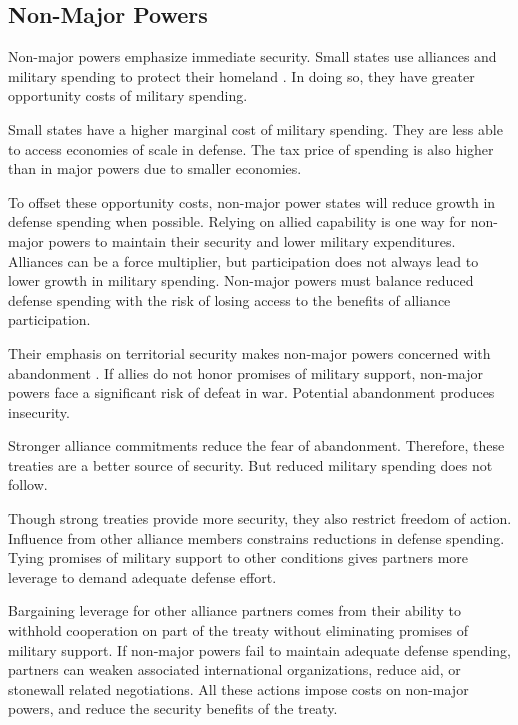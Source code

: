\documentclass[12pt]{article}
\begin{document}
\subsection{Non-Major Powers} 


Non-major powers emphasize immediate security.
Small states use alliances and military spending to protect their homeland \citep{Morrow1991}.  
In doing so, they have greater opportunity costs of military spending. 


Small states have a higher marginal cost of military spending. 
They are less able to access economies of scale in defense. 
The tax price of spending is also higher than in major powers due to smaller economies.  


To offset these opportunity costs, non-major power states will reduce growth in defense spending when possible.
Relying on allied capability is one way for non-major powers to maintain their security and lower military expenditures.  
Alliances can be a force multiplier, but participation does not always lead to lower growth in military spending. 
Non-major powers must balance reduced defense spending with the risk of losing access to the benefits of alliance participation. 


Their emphasis on territorial security makes non-major powers concerned with abandonment \citep{Snyder1997}. 
If allies do not honor promises of military support, non-major powers face a significant risk of defeat in war. 
Potential abandonment produces insecurity. 


Stronger alliance commitments reduce the fear of abandonment. 
Therefore, these treaties are a better source of security. 
But reduced military spending does not follow. 


Though strong treaties provide more security, they also restrict freedom of action. 
Influence from other alliance members constrains reductions in defense spending.
Tying promises of military support to other conditions gives partners more leverage to demand adequate defense effort. 


Bargaining leverage for other alliance partners comes from their ability to withhold cooperation on part of the treaty without eliminating promises of military support. 
If non-major powers fail to maintain adequate defense spending, partners can weaken associated international organizations, reduce aid, or stonewall related negotiations. 
All these actions impose costs on non-major powers, and reduce the security benefits of the treaty. 
\end{document}
